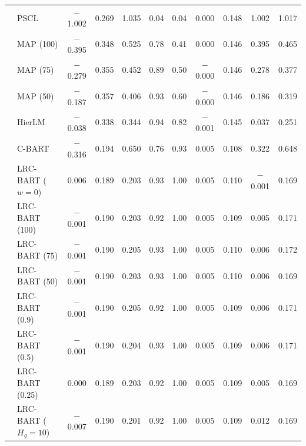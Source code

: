 \documentclass[11pt]{article}
\theoremstyle{definition}
\theoremstyle{plain}
\begin{document}
\begin{center}
\begin{longtable}{llccccccccc}
& PSCL & $-$1.002 & 0.269 & 1.035 & 0.04 & 0.04 & 0.000 & 0.148 & 1.002 & 1.017 \\
& MAP (100) & $-$0.395 & 0.348 & 0.525 & 0.78 & 0.41 & 0.000 & 0.146 & 0.395 & 0.465 \\
& MAP (75) & $-$0.279 & 0.355 & 0.452 & 0.89 & 0.50 & $-$0.000 & 0.146 & 0.278 & 0.377 \\
& MAP (50) & $-$0.187 & 0.357 & 0.406 & 0.93 & 0.60 & $-$0.000 & 0.146 & 0.186 & 0.319 \\
& HierLM & $-$0.038 & 0.338 & 0.344 & 0.94 & 0.82 & $-$0.001 & 0.145 & 0.037 & 0.251 \\
& C-BART & $-$0.316 & 0.194 & 0.650 & 0.76 & 0.93 & 0.005 & 0.108 & 0.322 & 0.648 \\
& LRC-BART ($w=0$) & 0.006 & 0.189 & 0.203 & 0.93 & 1.00 & 0.005 & 0.110 & $-$0.001 & 0.169 \\
& LRC-BART (100) & $-$0.001 & 0.190 & 0.203 & 0.92 & 1.00 & 0.005 & 0.109 & 0.005 & 0.171 \\
& LRC-BART (75) & $-$0.001 & 0.190 & 0.205 & 0.93 & 1.00 & 0.005 & 0.110 & 0.006 & 0.172 \\
& LRC-BART (50) & $-$0.001 & 0.190 & 0.203 & 0.93 & 1.00 & 0.005 & 0.110 & 0.006 & 0.169 \\
& LRC-BART (0.9) & $-$0.001 & 0.190 & 0.205 & 0.92 & 1.00 & 0.005 & 0.109 & 0.006 & 0.171 \\
& LRC-BART (0.5) & $-$0.001 & 0.190 & 0.204 & 0.93 & 1.00 & 0.005 & 0.109 & 0.006 & 0.171 \\
& LRC-BART (0.25) & 0.000 & 0.189 & 0.203 & 0.92 & 1.00 & 0.005 & 0.109 & 0.005 & 0.169 \\
& LRC-BART ($H_g=10$) & $-$0.007 & 0.190 & 0.201 & 0.92 & 1.00 & 0.005 & 0.109 & 0.012 & 0.169 \\
\end{longtable}
\end{center}
\end{document}
